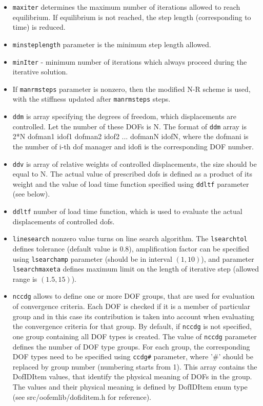 \documentclass[a4paper]{report}
\newcommand{\param}[1]{\texttt{#1}} %
\begin{document}
\begin{itemize}
\item \param{maxiter} determines the maximum
number of iterations allowed to reach equilibrium. If equilibrium is
not reached, the step length (corresponding to time) is reduced.
\item \param{minsteplength} parameter is the minimum step length
allowed.
\item \param{minIter} - minimum number of iterations which always proceed during the iterative solution.
\item If \param{manrmsteps} parameter is nonzero, then the modified
N-R scheme is used, with the stiffness updated after
\param{manrmsteps} steps.
\item \param{ddm} is array specifying the degrees of freedom,
which displacements are controlled.
Let the number of these DOFs is N.
The format of \param{ddm} array is 2*N dofman1 idof1
dofman2 idof2 ... dofmanN idofN, where the dofmani is the number of i-th dof manager  and idofi is the
corresponding DOF number.
\item \param{ddv} is array of relative weights of controlled
displacements, the size should be equal to N. The actual value of
prescribed dofs is defined as a product of its weight and the value of
load time function specified using \param{ddltf} parameter (see
below).
\item \param{ddltf} number of load time function, which is used to
evaluate the actual displacements of controlled dofs.
\item \param {linesearch} nonzero value turns on line search
  algorithm. The \param{lsearchtol} defines tolerance (default value
  is 0.8), amplification
  factor can be specified using \param{lsearchamp} parameter (should
  be in interval $(1,10)$), and parameter \param{lsearchmaxeta}
  defines maximum limit on the length of iterative step (allowed range
  is $(1.5,15)$).
\item \param{nccdg} allows to define one or more DOF groups, that are used for evaluation of convergence criteria. Each DOF is checked if it is a member of particular group and in this case its contribution is taken into account when evaluating the convergence criteria for that group. By default, if \param{nccdg} is not specified, one group containing all DOF types is created. The value of \param{nccdg} parameter defines the number of DOF type groups. For each group, the corresponding DOF types need to be specified using \param{ccdg\#} parameter, where '\#' should be replaced by group number (numbering starts from 1). This array contains the DofIDItem values, that identify the physical meaning of DOFs in the group. The values and their physical meaning is defined by DofIDItem enum type (see src/oofemlib/dofiditem.h for reference).

\end{itemize}
\end{document}
